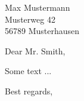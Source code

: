 \documentclass[lettersetup]{scrlttr2}
\begin{document}
\begin{letter}{
  Max Mustermann \\
  Musterweg 42 \\
  56789 Musterhausen
}

\opening{Dear Mr. Smith,}

Some text ...

\closing{Best regards,}

\end{letter}
\end{document}
